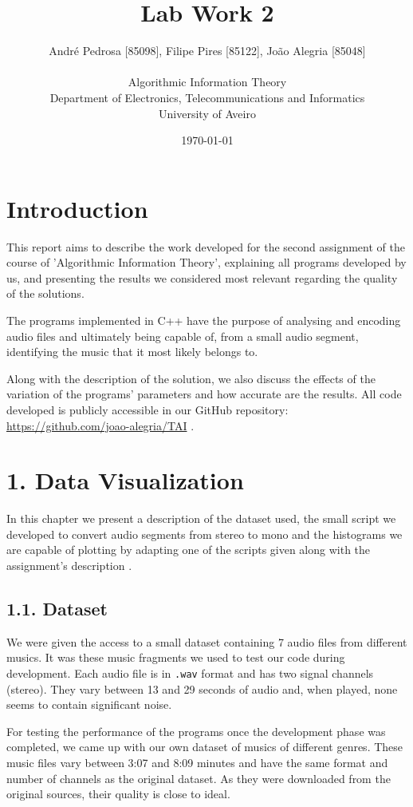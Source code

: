 \documentclass[12pt]{article}
\title{Lab Work 2}
\author
{André Pedrosa [85098], Filipe Pires [85122], João Alegria [85048]\\
\\
Algorithmic Information Theory\\
\normalsize{Department of Electronics, Telecommunications and Informatics}\\
\normalsize{University of Aveiro}\\
}
\date{\today{}}
\begin{document}
 

\baselineskip18pt

\maketitle 

\section*{Introduction}

This report aims to describe the work developed for the second assignment
of the course of 'Algorithmic Information Theory', explaining all programs
developed by us, and presenting the results we considered most relevant 
regarding the quality of the solutions. 

The programs implemented in C++ have the purpose of analysing and encoding
audio files and ultimately being capable of, from a small audio segment, 
identifying the music that it most likely belongs to.

Along with the description of the solution, we also discuss the effects
of the variation of the programs' parameters and how accurate are the results.
All code developed is publicly accessible in our GitHub repository:
\url{https://github.com/joao-alegria/TAI} .
\newpage

\section*{1. Data Visualization}

In this chapter we present a description of the dataset used, the small script 
we developed to convert audio segments from stereo to mono and the histograms
we are capable of plotting by adapting one of the scripts given along with the
assignment's description \cite{trab1}.

\subsection*{1.1. Dataset}

We were given the access to a small dataset containing 7 audio files from 
different musics. It was these music fragments we used to test our code during 
development.
Each audio file is in \texttt{.wav} format and has two signal channels (stereo).
They vary between 13 and 29 seconds of audio and, when played, none seems to 
contain significant noise.

For testing the performance of the programs once the development phase was
completed, we came up with our own dataset of musics of different genres.
These music files vary between 3:07 and 8:09 minutes and have the same format 
and number of channels as the original dataset.
As they were downloaded from the original sources, their quality is close to 
ideal.
\end{document}
